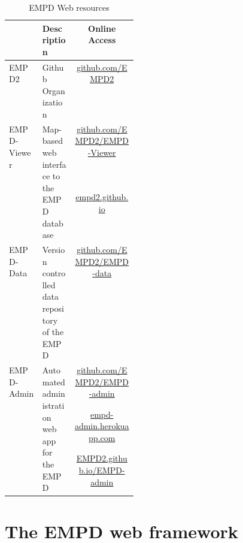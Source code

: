 \documentclass[
11pt, %
english, %
singlespacing, %
headsepline, %
]{MastersDoctoralThesis} %
\begin{document}
\begin{NoHyper}
\begin{refsection}
\begin{table}
	\caption{EMPD Web resources}
	\label{tab:empd-links}
	\begin{tabular}{|l|p{0.25\linewidth}|c|}
		\hline 
		& Description & Online Access \\ 
		\hline
		EMPD2 & Github Organization & \href{https://github.com/EMPD2}{github.com/EMPD2} \\
		\hline 
		\multirow{3}{*}{EMPD-Viewer} & \multirow{3}{\linewidth}{Map-based web interface to the EMPD database} & \href{https://github.com/EMPD2/EMPD-viewer}{github.com/EMPD2/EMPD-Viewer} \\
		& & \href{https://empd2.github.io/}{empd2.github.io} \\
		& & \\
		\hline 
		\multirow{3}{*}{EMPD-Data} & \multirow{3}{\linewidth}{Version controlled data repository of the EMPD} & \href{https://github.com/EMPD2/EMPD-data}{github.com/EMPD2/EMPD-data}  \\ 
		& & \\
		& & \\
		\hline 
		\multirow{3}{*}{EMPD-Admin} &  \multirow{3}{\linewidth}{Automated administration web app for the EMPD} & \href{https://github.com/EMPD2/EMPD-admin}{github.com/EMPD2/EMPD-admin} \\ 
		& & \href{https://empd-admin.herokuapp.com/}{empd-admin.herokuapp.com} \\ 
		& & \href{https://EMPD2.github.io/EMPD-admin}{EMPD2.github.io/EMPD-admin} \\ 
		\hline 
	\end{tabular} 
\end{table}

\section{The EMPD web framework}\label{sec:empd-web-framework}


\end{refsection}
\end{NoHyper}
\end{document}
